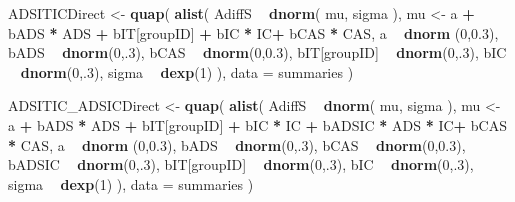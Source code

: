 \documentclass[10pt,dvipsnames,enabledeprecatedfontcommands]{scrartcl}
\newenvironment{Shaded}{\begin{snugshade}}{\end{snugshade}}
\newcommand{\KeywordTok}[1]{\textcolor[rgb]{0.13,0.29,0.53}{\textbf{#1}}}
\newcommand{\DataTypeTok}[1]{\textcolor[rgb]{0.13,0.29,0.53}{#1}}
\newcommand{\DecValTok}[1]{\textcolor[rgb]{0.00,0.00,0.81}{#1}}
\newcommand{\FloatTok}[1]{\textcolor[rgb]{0.00,0.00,0.81}{#1}}
\newcommand{\StringTok}[1]{\textcolor[rgb]{0.31,0.60,0.02}{#1}}
\newcommand{\OperatorTok}[1]{\textcolor[rgb]{0.81,0.36,0.00}{\textbf{#1}}}
\newcommand{\NormalTok}[1]{#1}
\begin{document}
\begin{Shaded}
\begin{Highlighting}[]
\NormalTok{ADSITICDirect <-}\StringTok{ }\KeywordTok{quap}\NormalTok{(}
  \KeywordTok{alist}\NormalTok{(}
\NormalTok{    AdiffS }\OperatorTok{~}\StringTok{ }\KeywordTok{dnorm}\NormalTok{( mu, sigma ),}
\NormalTok{    mu <-}\StringTok{ }\NormalTok{a }\OperatorTok{+}\StringTok{ }\NormalTok{bADS }\OperatorTok{*}\StringTok{ }\NormalTok{ADS }\OperatorTok{+}\StringTok{  }\NormalTok{bIT[groupID] }\OperatorTok{+}\StringTok{ }\NormalTok{bIC }\OperatorTok{*}\StringTok{ }\NormalTok{IC}\OperatorTok{+}\StringTok{ }\NormalTok{bCAS }\OperatorTok{*}\StringTok{ }\NormalTok{CAS,}
\NormalTok{    a }\OperatorTok{~}\StringTok{ }\KeywordTok{dnorm}\NormalTok{ (}\DecValTok{0}\NormalTok{,}\FloatTok{0.3}\NormalTok{),}
\NormalTok{    bADS }\OperatorTok{~}\StringTok{ }\KeywordTok{dnorm}\NormalTok{(}\DecValTok{0}\NormalTok{,.}\DecValTok{3}\NormalTok{),}
\NormalTok{    bCAS }\OperatorTok{~}\StringTok{ }\KeywordTok{dnorm}\NormalTok{(}\DecValTok{0}\NormalTok{,}\FloatTok{0.3}\NormalTok{),}
\NormalTok{    bIT[groupID] }\OperatorTok{~}\StringTok{ }\KeywordTok{dnorm}\NormalTok{(}\DecValTok{0}\NormalTok{,.}\DecValTok{3}\NormalTok{),}
\NormalTok{    bIC }\OperatorTok{~}\StringTok{ }\KeywordTok{dnorm}\NormalTok{(}\DecValTok{0}\NormalTok{,.}\DecValTok{3}\NormalTok{),}
\NormalTok{    sigma  }\OperatorTok{~}\StringTok{ }\KeywordTok{dexp}\NormalTok{(}\DecValTok{1}\NormalTok{)}
\NormalTok{  ), }
  \DataTypeTok{data =}\NormalTok{ summaries}
\NormalTok{)}


\NormalTok{ADSITIC_ADSICDirect <-}\StringTok{ }\KeywordTok{quap}\NormalTok{(}
  \KeywordTok{alist}\NormalTok{(}
\NormalTok{    AdiffS }\OperatorTok{~}\StringTok{ }\KeywordTok{dnorm}\NormalTok{( mu, sigma ),}
\NormalTok{    mu <-}\StringTok{ }\NormalTok{a }\OperatorTok{+}\StringTok{ }\NormalTok{bADS }\OperatorTok{*}\StringTok{ }\NormalTok{ADS }\OperatorTok{+}\StringTok{  }\NormalTok{bIT[groupID] }\OperatorTok{+}\StringTok{ }\NormalTok{bIC }\OperatorTok{*}\StringTok{ }\NormalTok{IC }\OperatorTok{+}\StringTok{ }\NormalTok{bADSIC }\OperatorTok{*}\StringTok{ }\NormalTok{ADS }\OperatorTok{*}\StringTok{ }\NormalTok{IC}\OperatorTok{+}\StringTok{ }\NormalTok{bCAS }\OperatorTok{*}\StringTok{ }\NormalTok{CAS,}
\NormalTok{    a }\OperatorTok{~}\StringTok{ }\KeywordTok{dnorm}\NormalTok{ (}\DecValTok{0}\NormalTok{,}\FloatTok{0.3}\NormalTok{),}
\NormalTok{    bADS }\OperatorTok{~}\StringTok{ }\KeywordTok{dnorm}\NormalTok{(}\DecValTok{0}\NormalTok{,.}\DecValTok{3}\NormalTok{),}
\NormalTok{    bCAS }\OperatorTok{~}\StringTok{ }\KeywordTok{dnorm}\NormalTok{(}\DecValTok{0}\NormalTok{,}\FloatTok{0.3}\NormalTok{),}
\NormalTok{    bADSIC }\OperatorTok{~}\StringTok{ }\KeywordTok{dnorm}\NormalTok{(}\DecValTok{0}\NormalTok{,.}\DecValTok{3}\NormalTok{),}
\NormalTok{    bIT[groupID] }\OperatorTok{~}\StringTok{ }\KeywordTok{dnorm}\NormalTok{(}\DecValTok{0}\NormalTok{,.}\DecValTok{3}\NormalTok{),}
\NormalTok{    bIC }\OperatorTok{~}\StringTok{ }\KeywordTok{dnorm}\NormalTok{(}\DecValTok{0}\NormalTok{,.}\DecValTok{3}\NormalTok{),}
\NormalTok{    sigma  }\OperatorTok{~}\StringTok{ }\KeywordTok{dexp}\NormalTok{(}\DecValTok{1}\NormalTok{)}
\NormalTok{  ), }
  \DataTypeTok{data =}\NormalTok{ summaries}
\NormalTok{)}



\end{Highlighting}
\end{Shaded}
\end{document}
